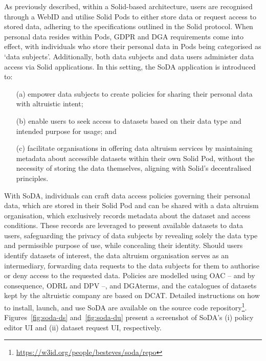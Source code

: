 As previously described, within a Solid-based architecture, users are recognised through a WebID and utilise Solid Pods to either store data or request access to stored data, adhering to the specifications outlined in the Solid protocol.
When personal data resides within Pods, GDPR and DGA requirements come into effect, with individuals who store their personal data in Pods being categorised as `data subjects'.
Additionally, both data subjects and data users administer data access via Solid applications.
In this setting, the SoDA application is introduced to:

\begin{enumerate}
    \item [(a)] empower data subjects to create policies for sharing their personal data with altruistic intent;
    \item [(b)] enable users to seek access to datasets based on their data type and intended purpose for usage; and
    \item [(c)] facilitate organisations in offering data altruism services by maintaining metadata about accessible datasets within their own Solid Pod, without the necessity of storing the data themselves, aligning with Solid's decentralised principles.
\end{enumerate}

With SoDA, individuals can craft data access policies governing their personal data, which are stored in their Solid Pod and can be shared with a data altruism organisation, which exclusively records metadata about the dataset and access conditions.
These records are leveraged to present available datasets to data users, safeguarding the privacy of data subjects by revealing solely the data type and permissible purpose of use, while concealing their identity. 
Should users identify datasets of interest, the data altruism organisation serves as an intermediary, forwarding data requests to the data subjects for them to authorise or deny access to the requested data.
Policies are modelled using OAC -- and by consequence, ODRL and DPV --, and DGAterms, and the catalogues of datasets kept by the altruistic company are based on DCAT.
Detailed instructions on how to install, launch, and use SoDA are available on the source code repository\footnote{\url{https://w3id.org/people/besteves/soda/repo}}.
Figures~\ref{fig:soda-ds} and~\ref{fig:soda-du} present a screenshot of SoDA's (i) policy editor UI and (ii) dataset request UI, respectively.

